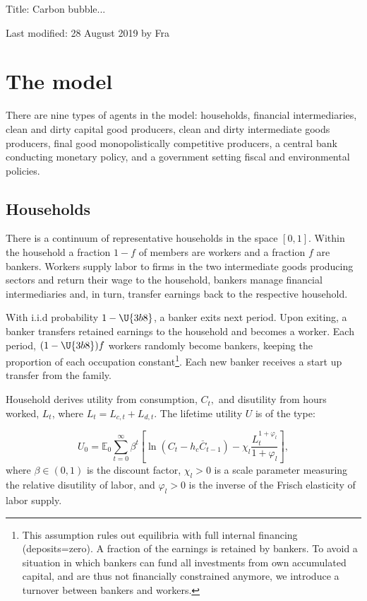 \documentclass{article}
\begin{document}
\begin{center}
{\LARGE Title: Carbon bubble...}

Last modified: 28 August 2019 by Fra
\end{center}

\section{The model}

There are nine types of agents in the model: households, financial
intermediaries, clean and dirty capital good producers, clean and dirty
intermediate goods producers, final good monopolistically competitive
producers, a central bank conducting monetary policy, and a government
setting fiscal and environmental policies.

\subsection{Households}

There is a continuum of representative households in the space $[0,1]$.
Within the household a fraction $1-f$ of members are workers and a fraction $%
f$ are bankers. Workers supply labor to firms in the two intermediate goods
producing sectors and return their wage to the household, bankers manage
financial intermediaries and, in turn, transfer earnings back to the
respective household.

With i.i.d probability $1-\U{3b8} $, a banker exits next period. Upon
exiting, a banker transfers retained earnings to the household and becomes a
worker. Each period, $(1-\U{3b8} )f$ workers randomly become bankers,
keeping the proportion of each occupation constant\footnote{%
This assumption rules out equilibria with full internal financing
(deposits=zero). A fraction of the earnings is retained by bankers. To avoid
a situation in which bankers can fund all investments from own accumulated
capital, and are thus not financially constrained anymore, we introduce a
turnover between bankers and workers.}. Each new banker receives a start up
transfer from the family.

Household derives utility from consumption, $C_{t},$ and disutility from
hours worked, $L_{t}$, where $L_{t}=L_{c,t}+L_{d,t}$. The lifetime utility $%
U $ is of the type:

\begin{equation}
U_{0}=\mathbb{E}_{0}\sum_{t=0}^{\infty }\beta ^{t}\left[ \ln \left(
C_{t}-h_{c}\overset{\_}{C}_{t-1}\right) -\chi _{l}\frac{L_{t}^{1+\varphi
_{l}}}{1+\varphi _{l}}\right] ,  \label{utility}
\end{equation}%
where $\beta \in (0,1)$ is the discount factor, $\chi _{l}>0$ is a scale
parameter measuring the relative disutility of labor, and $\varphi _{l}>0$
is the inverse of the Frisch elasticity of labor supply.
\end{document}
